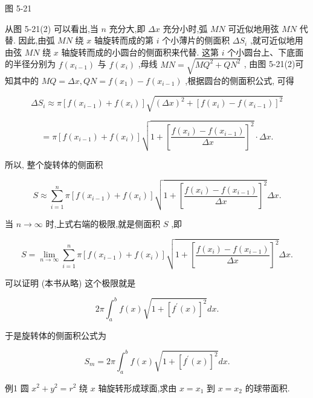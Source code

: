 \documentclass[lang=cn,newtx,10pt,scheme=chinese]{elegantbook}
\begin{document}
图 5-21

从图 5-21(2) 可以看出,当 \(n\) 充分大,即 \({\Delta x}\) 充分小时,弧 \({MN}\) 可近似地用弦 \({MN}\) 代替. 因此,由弧 \({MN}\) 绕 \(x\) 轴旋转而成的第 \(i\) 个小薄片的侧面积 \(\Delta {S}_{i}\) ,就可近似地用由弦 \({MN}\) 绕 \(x\) 轴旋转而成的小圆台的侧面积来代替. 这第 \(i\) 个小圆台上、下底面的半径分别为 \(f\left( {x}_{i - 1}\right)\) 与 \(f\left( {x}_{i}\right)\) ,母线 \({MN} = \sqrt{M{Q}^{2} + Q{N}^{2}}\) , 由图 5-21(2)可知其中的 \({MQ} = {\Delta x},{QN} = f\left( {x}_{1}\right) - f\left( {x}_{i - 1}\right)\) ,根据圆台的侧面积公式, 可得

\[
\Delta {S}_{i} \approx \pi \left\lbrack {f\left( {x}_{i - 1}\right) + f\left( {x}_{i}\right) }\right\rbrack \sqrt{{\left( \Delta x\right) }^{2} + {\left\lbrack f\left( {x}_{i}\right) - f\left( {x}_{i - 1}\right) \right\rbrack }^{2}}
\]

\[
= \pi \left\lbrack {f\left( {x}_{i - 1}\right) + f\left( {x}_{i}\right) }\right\rbrack \sqrt{1 + {\left\lbrack \frac{f\left( {x}_{i}\right) - f\left( {x}_{i - 1}\right) }{\Delta x}\right\rbrack }^{2}} \cdot {\Delta x}.
\]

所以, 整个旋转体的侧面积

\[
S \approx \mathop{\sum }\limits_{{i = 1}}^{n}\pi \left\lbrack {f\left( {x}_{i - 1}\right) + f\left( {x}_{i}\right) }\right\rbrack \sqrt{1 + {\left\lbrack \frac{f\left( {x}_{i}\right) - f\left( {x}_{i - 1}\right) }{\Delta x}\right\rbrack }^{2}}{\Delta x}.
\]

当 \(n \rightarrow \infty\) 时,上式右端的极限,就是侧面积 \(S\) ,即

\[
S = \mathop{\lim }\limits_{{n \rightarrow \infty }}\mathop{\sum }\limits_{{i = 1}}^{n}\pi \left\lbrack {f\left( {x}_{i - 1}\right) + f\left( {x}_{i}\right) }\right\rbrack \sqrt{1 + {\left\lbrack \frac{f\left( {x}_{i}\right) - f\left( {x}_{i - 1}\right) }{\Delta x}\right\rbrack }^{2}}{\Delta x}.
\]

可以证明 (本书从略) 这个极限就是

\[
{2\pi }{\int }_{a}^{b}f\left( x\right) \sqrt{1 + {\left\lbrack {f}^{\prime }\left( x\right) \right\rbrack }^{2}}{dx}.
\]

于是旋转体的侧面积公式为

\[
{S}_{m} = {2\pi }{\int }_{a}^{b}f\left( x\right) \sqrt{1 + {\left\lbrack {f}^{\prime }\left( x\right) \right\rbrack }^{2}}{dx}.
\]

例1 圆 \({x}^{2} + {y}^{2} = {r}^{2}\) 绕 \(x\) 轴旋转形成球面,求由 \(x = {x}_{1}\) 到 \(x = {x}_{2}\) 的球带面积.
\end{document}
